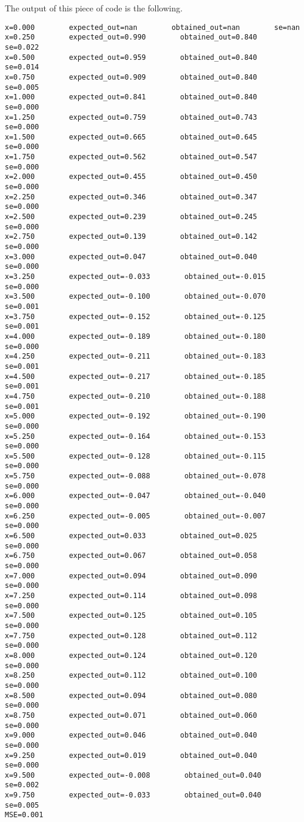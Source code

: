 	The output of this piece of code is the following.
\begin{verbatim}
x=0.000        expected_out=nan        obtained_out=nan        se=nan
x=0.250        expected_out=0.990        obtained_out=0.840        se=0.022
x=0.500        expected_out=0.959        obtained_out=0.840        se=0.014
x=0.750        expected_out=0.909        obtained_out=0.840        se=0.005
x=1.000        expected_out=0.841        obtained_out=0.840        se=0.000
x=1.250        expected_out=0.759        obtained_out=0.743        se=0.000
x=1.500        expected_out=0.665        obtained_out=0.645        se=0.000
x=1.750        expected_out=0.562        obtained_out=0.547        se=0.000
x=2.000        expected_out=0.455        obtained_out=0.450        se=0.000
x=2.250        expected_out=0.346        obtained_out=0.347        se=0.000
x=2.500        expected_out=0.239        obtained_out=0.245        se=0.000
x=2.750        expected_out=0.139        obtained_out=0.142        se=0.000
x=3.000        expected_out=0.047        obtained_out=0.040        se=0.000
x=3.250        expected_out=-0.033        obtained_out=-0.015        se=0.000
x=3.500        expected_out=-0.100        obtained_out=-0.070        se=0.001
x=3.750        expected_out=-0.152        obtained_out=-0.125        se=0.001
x=4.000        expected_out=-0.189        obtained_out=-0.180        se=0.000
x=4.250        expected_out=-0.211        obtained_out=-0.183        se=0.001
x=4.500        expected_out=-0.217        obtained_out=-0.185        se=0.001
x=4.750        expected_out=-0.210        obtained_out=-0.188        se=0.001
x=5.000        expected_out=-0.192        obtained_out=-0.190        se=0.000
x=5.250        expected_out=-0.164        obtained_out=-0.153        se=0.000
x=5.500        expected_out=-0.128        obtained_out=-0.115        se=0.000
x=5.750        expected_out=-0.088        obtained_out=-0.078        se=0.000
x=6.000        expected_out=-0.047        obtained_out=-0.040        se=0.000
x=6.250        expected_out=-0.005        obtained_out=-0.007        se=0.000
x=6.500        expected_out=0.033        obtained_out=0.025        se=0.000
x=6.750        expected_out=0.067        obtained_out=0.058        se=0.000
x=7.000        expected_out=0.094        obtained_out=0.090        se=0.000
x=7.250        expected_out=0.114        obtained_out=0.098        se=0.000
x=7.500        expected_out=0.125        obtained_out=0.105        se=0.000
x=7.750        expected_out=0.128        obtained_out=0.112        se=0.000
x=8.000        expected_out=0.124        obtained_out=0.120        se=0.000
x=8.250        expected_out=0.112        obtained_out=0.100        se=0.000
x=8.500        expected_out=0.094        obtained_out=0.080        se=0.000
x=8.750        expected_out=0.071        obtained_out=0.060        se=0.000
x=9.000        expected_out=0.046        obtained_out=0.040        se=0.000
x=9.250        expected_out=0.019        obtained_out=0.040        se=0.000
x=9.500        expected_out=-0.008        obtained_out=0.040        se=0.002
x=9.750        expected_out=-0.033        obtained_out=0.040        se=0.005
MSE=0.001
\end{verbatim}
